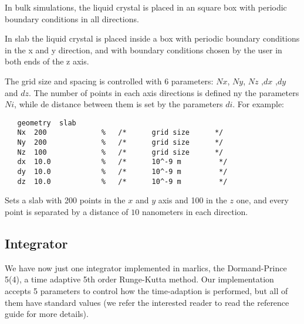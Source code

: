 \documentclass{article}
\begin{document}
In bulk simulations, the liquid crystal is placed in an square box with periodic boundary conditions in all directions.

In slab the liquid crystal is placed inside a box with periodic boundary conditions in the x and y direction, and with boundary conditions chosen by the user in both ends of the z axis.


The grid size and spacing is controlled with 6 parameters: $Nx$, $Ny$, $Nz$ ,$dx$ ,$dy$ and $dz$. The number of points in each axis directions is defined ny the parameters $Ni$, while de distance between them is set by the parameters $di$. For example:

\begin{lstlisting}	
   geometry  slab
   Nx  200             %   /*      grid size      */
   Ny  200             %   /*      grid size      */
   Nz  100             %   /*      grid size      */
   dx  10.0            %   /*      10^-9 m         */
   dy  10.0            %   /*      10^-9 m         */
   dz  10.0            %   /*      10^-9 m         */
\end{lstlisting}

Sets a slab with 200 points in the $x$ and $y$ axis and 100 in the $z$ one, and every point is separated by a distance of $10$ nanometers in each direction.

\subsection{Integrator}\label{integrator.param}

We have now just one integrator implemented in marlics, the Dormand-Prince 5(4), a time adaptive 5th order Runge-Kutta method. Our implementation accepts 5 parameters to control how the time-adaption is performed, but all of them have standard values (we refer the interested reader to read the reference guide for more details).
\end{document}
